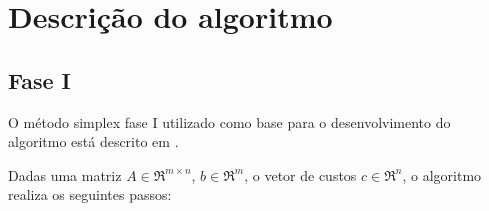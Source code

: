 \documentclass[
	12pt,				%
	openright,			%
	oneside,			%
	a4paper,			%
	english,			%
	french,				%
	spanish,			%
	brazil,				%
	]{abntex2}
\begin{document}
%
%
%
\chapter{Descrição do algoritmo}
\section{Fase I}
O método simplex fase I utilizado como base para o desenvolvimento do algoritmo está descrito em
  . 
  
Dadas uma matriz $A \in \Re ^{m \times n}$, $b \in \Re ^m$, o vetor de custos $c \in\Re ^n$, o algoritmo realiza os seguintes passos:
\end{document}
